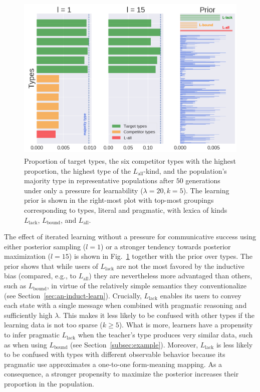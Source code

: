\documentclass[a4paper, 11pt]{article}
\theoremstyle{Satz}
\newcommand{\mylang}[1]{\ensuremath{L_{\text{#1}}}\xspace} %
\newcommand{\Lall}{\mylang{all}}
\newcommand{\Lbound}{\mylang{bound}}
\newcommand{\Llack}{\mylang{lack}}
\begin{document}
\begin{figure}[t]
\centering
\includegraphics[width=1\textwidth,height=8cm,keepaspectratio]{./plots/barh-onlym}

\caption{Proportion of target types, the six competitor types with the highest proportion, the highest type of the $\Lall$-kind, and the population's majority type in representative populations after $50$ generations under only a
  pressure for learnability ($\lambda = 20, k = 5$). The learning prior is shown in the
  right-most plot with top-most groupings corresponding to types, literal and pragmatic, with
  lexica of kinds $\Llack$, $\Lbound$, and $\Lall$.}
\label{fig:only-M}
\end{figure}

The effect of iterated learning without a pressure for communicative success using either posterior
sampling ($l = 1$) or a stronger tendency towards posterior maximization ($l = 15$) is shown in
Fig.~\ref{fig:only-M} together with the prior over types. The prior shows that while users of
$\Llack$ are not the most favored by the inductive bias (compared, e.g., to $\Lall$) they are
nevertheless more advantaged than others, such as $\Lbound$, in virtue of the relatively simple
semantics they conventionalize (see Section~\ref{sec:an-induct-learn}). Crucially, $\Llack$
enables its users to convey each state with a single message when combined with pragmatic
reasoning and sufficiently high $\lambda$. This makes it less likely to be confused with
other types if the learning data is not too sparse ($k \geq 5$). What is more, learners have
a propensity to infer pragmatic $\Llack$ when the teacher's type produces very similar
data, such as when using $\Lbound$ (see Section~\ref{subsec:example}). Moreover, $\Llack$ is less likely to be confused with
types with different observable behavior because its pragmatic use approximates a one-to-one
form-meaning mapping. As a consequence, a stronger propensity to maximize the posterior
increases their proportion in the population.
\end{document}
